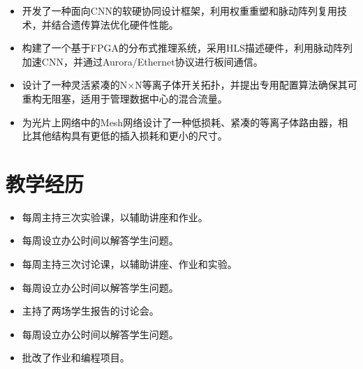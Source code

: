\documentclass{resume}
\begin{document}
\vspace{-8pt}
\begin{itemize}
    \item 开发了一种面向CNN的软硬协同设计框架，利用权重重塑和脉动阵列复用技术，并结合遗传算法优化硬件性能。
    \item 构建了一个基于FPGA的分布式推理系统，采用HLS描述硬件，利用脉动阵列加速CNN，并通过Aurora/Ethernet协议进行板间通信。
    \item 设计了一种灵活紧凑的N×N等离子体开关拓扑，并提出专用配置算法确保其可重构无阻塞，适用于管理数据中心的混合流量。
    \item 为光片上网络中的Mesh网络设计了一种低损耗、紧凑的等离子体路由器，相比其他结构具有更低的插入损耗和更小的尺寸。
\end{itemize}

\section{教学经历}
\vspace{-8pt}
\begin{itemize}
    \item 每周主持三次实验课，以辅助讲座和作业。
    \item 每周设立办公时间以解答学生问题。
\end{itemize}

\vspace{-8pt}
\begin{itemize}
    \item 每周主持三次讨论课，以辅助讲座、作业和实验。
    \item 每周设立办公时间以解答学生问题。
\end{itemize}

\vspace{-8pt}
\begin{itemize}
    \item 主持了两场学生报告的讨论会。
    \item 每周设立办公时间以解答学生问题。
    \item 批改了作业和编程项目。
\end{itemize}
\end{document}
